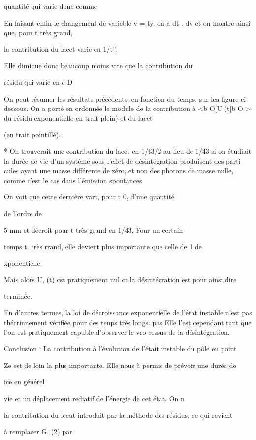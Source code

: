 quantité qui varie donc comme


En faisant enfin le changement de varieble v = ty, on a
 dt  .
 dv et on montre ainsi que, pour t très grand,

la contribution du lacet varie en 1/t”.

Elle diminue donc beaucoup moins vite que la contribution du

résidu qui varie en e D

On peut résumer les résultats précédents, en fonction du temps,
sur lea figure ci-dessous. On a porté en ordonnée le module de la contribution
à <b O[U (t[b O > du résidu exponentielle en trait plein) et du lacet

(en trait pointillé).


* On trouverait une contribution du lacet en 1/t3/2 au lieu de 1/43 si on étudiait
la durée de vie d'un système sous l'effet de désintégration produisent des parti
cules ayant une masse différente de zéro, et non des photons de masse nulle, comme
c'est le cas dans l'émission spontances

On voit que cette dernière vart, pour t  0, d'une quantité

de l'ordre de 

5 mm et décroit pour t très grand en 1/43, Four un certain

temps t. très rrand, elle devient plus importante que celle de 1
 de

xponentielle.

Mais alors U, (t) cst pratiquement nul ct la désintécration est pour ainsi dire

terminée.

En d'autres termes, la loi de décroissance exponentielle de
l'état instable n'est pas thécrinnement vérifiée pour des tenps très longs.
pas
Elle l'est cependant tant que l'on est pratiquement capuble d'observer le vro
cessus de la désintégration.

Conclusion : La contribution à l'évolution de l'était instable du pôle eu point

Ze est de loin la plus importante. Elle nous à permis de prévoir une duréc de

ice en générel

vie et un déplacement rediatif de l'énergie de cet état. On n

la contribution du lecut introduit par la méthode des résidus, ce qui revient

à remplacer G, (2) par


